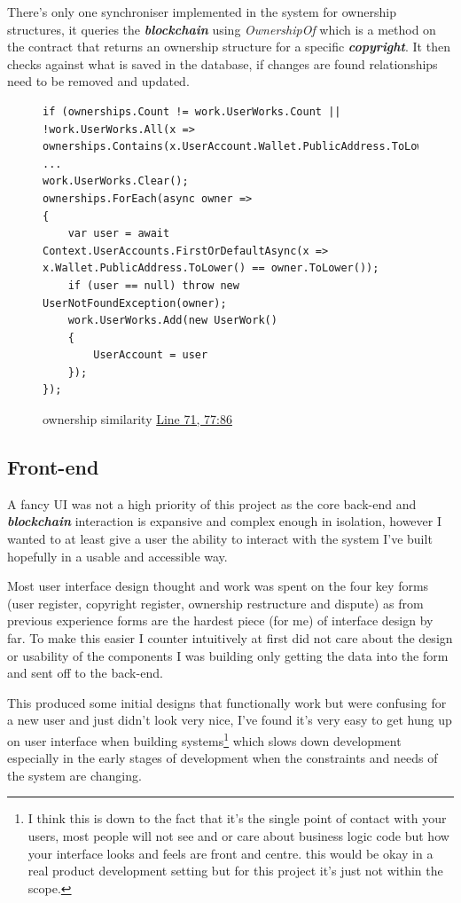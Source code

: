 \documentclass[12pt]{article}
\newcommand{\keyword}[1]{\textbf{\textit{#1}}}
\begin{document}
There's only one synchroniser implemented in the system for ownership structures, it queries the \keyword{blockchain} using \textit{OwnershipOf} which is a method on the contract that returns an ownership structure for a specific \keyword{copyright}. It then checks against what is saved in the database, if changes are found relationships need to be removed and updated.

\begin{figure}[H]
\caption{ownership similarity \href{https://github.com/MrHarrisonBarker/CRPL/blob/main/CRPL.Web/Core/ChainSync/Synchronisers/OwnershipSynchroniser.cs}{Line 71, 77:86}}
\centering
\begin{lstlisting}[language=CSharp]
if (ownerships.Count != work.UserWorks.Count || !work.UserWorks.All(x => ownerships.Contains(x.UserAccount.Wallet.PublicAddress.ToLower())))
...
work.UserWorks.Clear();
ownerships.ForEach(async owner =>
{
	var user = await Context.UserAccounts.FirstOrDefaultAsync(x => x.Wallet.PublicAddress.ToLower() == owner.ToLower());
	if (user == null) throw new UserNotFoundException(owner);
	work.UserWorks.Add(new UserWork()
	{
		UserAccount = user
	});
});
\end{lstlisting}
\end{figure}

\subsection{Front-end}

A fancy UI was not a high priority of this project as the core back-end and \keyword{blockchain} interaction is expansive and complex enough in isolation, however I wanted to at least give a user the ability to interact with the system I've built hopefully in a usable and accessible way.

Most user interface design thought and work was spent on the four key forms (user register, copyright register, ownership restructure and dispute) as from previous experience forms are the hardest piece (for me) of interface design by far. To make this easier I counter intuitively at first did not care about the design or usability of the components I was building only getting the data into the form and sent off to the back-end.

This produced some initial designs that functionally work but were confusing for a new user and just didn't look very nice, I've found it's very easy to get hung up on user interface when building systems\footnote{I think this is down to the fact that it's the single point of contact with your users, most people will not see and or care about business logic code but how your interface looks and feels are front and centre. this would be okay in a real product development setting but for this project it's just not within the scope.} which slows down development especially in the early stages of development when the constraints and needs of the system are changing.
\end{document}
